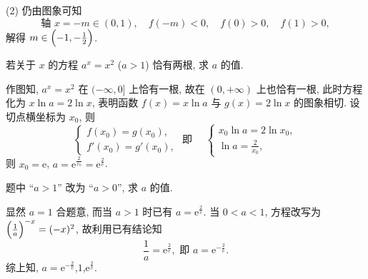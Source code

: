     (2) 仍由图象可知
    \[\text{轴 }x=-m\in(0,1),\quad f(-m)<0,\quad f(0)>0,\quad f(1)>0,\]
    解得 $m\in\Bigl(-1,-\frac12\Bigr)$.
  \endsolution

  \begin{exercise}
    若关于 $x$ 的方程 $a^x=x^2$ ($a>1$) 恰有两根, 求 $a$ 的值.
  \end{exercise}

  \beginsolution
    作图知, $a^x=x^2$ 在 $(-\infty,0]$ 上恰有一根, 故在 $(0,+\infty)$ 上也恰有一根, 此时方程化为 $x\ln a=2\ln x$, 表明函数 $f(x)=x\ln a$ 与 $g(x)=2\ln x$ 的图象相切. 设切点横坐标为 $x_0$, 则
    \[\left\{\begin{array}{ll}
        f(x_0)=g(x_0),\\ f'(x_0)=g'(x_0),
      \end{array}\right.\text{\ 即\ }\quad
      \left\{\begin{array}{ll}
        x_0\ln a=2\ln x_0,\\ \ln a= \frac2{x_0},
      \end{array}\right.\]
    则 $x_0=\mathrm{e}$, $a=\mathrm{e}^{\frac2{x_0}}= \mathrm{e}^{\frac2{\mathrm{e}}}$.
    
    \varexercise 题中 ``$a>1$'' 改为 ``$a>0$'', 求 $a$ 的值.
    
    显然 $a=1$ 合题意, 而当 $a>1$ 时已有 $a=\mathrm{e}^{\frac2{\mathrm{e}}}$. 当 $0<a<1$, 方程改写为 $\Bigl(\frac1a\Bigr)^{-x}=(-x)^2$, 故利用已有结论知
    \[\frac1a= \mathrm{e}^{\frac2{\mathrm{e}}}, \text{\ 即\ }
      a=\mathrm{e}^{-\frac2{\mathrm{e}}}.\]
    综上知, $a=\mathrm{e}^{-\frac2{\mathrm{e}}}$,$1$,$\mathrm{e}^{\frac2{\mathrm{e}}}$.
  \endsolution
  
